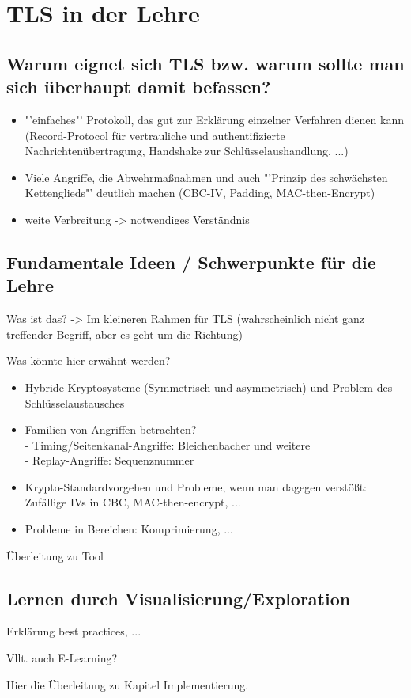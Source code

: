 \chapter{TLS in der Lehre}

\section{Warum eignet sich TLS bzw. warum sollte man sich überhaupt damit befassen?}

\begin{itemize}
	\item "'einfaches"' Protokoll, das gut zur Erklärung einzelner Verfahren dienen kann (Record-Protocol für vertrauliche und authentifizierte Nachrichtenübertragung, Handshake zur Schlüsselaushandlung, ...)
	\item Viele Angriffe, die Abwehrmaßnahmen und auch "'Prinzip des schwächsten Kettenglieds"' deutlich machen (CBC-IV, Padding, MAC-then-Encrypt)
	\item weite Verbreitung -> notwendiges Verständnis
\end{itemize}

\section{Fundamentale Ideen / Schwerpunkte für die Lehre}

Was ist das? -> Im kleineren Rahmen für TLS (wahrscheinlich nicht ganz treffender Begriff, aber es geht um die Richtung)

Was könnte hier erwähnt werden?

\begin{itemize}
	\item Hybride Kryptosysteme (Symmetrisch und asymmetrisch) und Problem des Schlüsselaustausches
	\item Familien von Angriffen betrachten?\\
	- Timing/Seitenkanal-Angriffe: Bleichenbacher und weitere\\
	- Replay-Angriffe: Sequenznummer
	\item Krypto-Standardvorgehen und Probleme, wenn man dagegen verstößt: Zufällige IVs in CBC, MAC-then-encrypt, ...
	\item Probleme in  Bereichen: Komprimierung, ...
\end{itemize}

Überleitung zu Tool

\section{Lernen durch Visualisierung/Exploration}

Erklärung best practices, ...

Vllt. auch E-Learning?

Hier die Überleitung zu Kapitel Implementierung. 